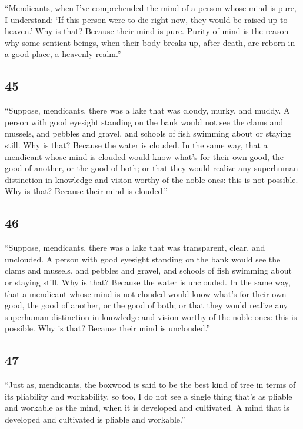 \documentclass[12pt,openany]{book}%
\begin{document}
“Mendicants, when I’ve comprehended the mind of a person whose mind is pure, I understand: ‘If this person were to die right now, they would be raised up to heaven.’ Why is that? Because their mind is pure. Purity of mind is the reason why some sentient beings, when their body breaks up, after death, are reborn in a good place, a heavenly realm.” 

\subsection*{45 }

“Suppose, mendicants, there was a lake that was cloudy, murky, and muddy. A person with good eyesight standing on the bank would not see the clams and mussels, and pebbles and gravel, and schools of fish swimming about or staying still. Why is that? Because the water is clouded. In the same way, that a mendicant whose mind is clouded would know what’s for their own good, the good of another, or the good of both; or that they would realize any superhuman distinction in knowledge and vision worthy of the noble ones: this is not possible. Why is that? Because their mind is clouded.” 

\subsection*{46 }

“Suppose, mendicants, there was a lake that was transparent, clear, and unclouded. A person with good eyesight standing on the bank would see the clams and mussels, and pebbles and gravel, and schools of fish swimming about or staying still. Why is that? Because the water is unclouded. In the same way, that a mendicant whose mind is not clouded would know what’s for their own good, the good of another, or the good of both; or that they would realize any superhuman distinction in knowledge and vision worthy of the noble ones: this is possible. Why is that? Because their mind is unclouded.” 

\subsection*{47 }

“Just as, mendicants, the boxwood is said to be the best kind of tree in terms of its pliability and workability, so too, I do not see a single thing that’s as pliable and workable as the mind, when it is developed and cultivated. A mind that is developed and cultivated is pliable and workable.” 
\end{document}
